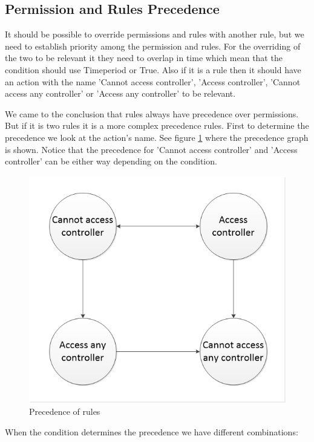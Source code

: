 
\subsection{Permission and Rules Precedence}
It should be possible to override permissions and rules with another rule, but we need to establish priority among the permission and rules. 
For the overriding of the two to be relevant it they need to overlap in time which mean that the condition should use Timeperiod or True. Also if it is a rule then it should have an action with the name 'Cannot access controller', 'Access controller', 'Cannot access any controller' or 'Access any controller' to be relevant. 

We came to the conclusion that rules always have precedence over permissions. But if it is two rules it is a more complex precedence rules. First to determine the precedence we look at the action's name. See figure \ref{fig:precendence} where the precedence graph is shown. Notice that the precedence for 'Cannot access controller' and 'Access controller' can be either way depending on the condition. 
  
\begin{figure}
	\centering
		\includegraphics[width=1.00\textwidth]{images/precendence.jpg}
	\caption{Precedence of rules}
	\label{fig:precendence}
\end{figure}

When the condition determines the precedence we have different combinations:

